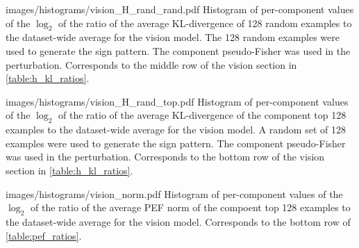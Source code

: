 \documentclass[dvipsnames]{article}
\begin{document}
\appendixhistogram
{images/histograms/vision_H_rand_rand.pdf}
{Histogram of per-component values of the $\log_2$ of the ratio of the average KL-divergence of 128 random examples to the dataset-wide average for the vision model.
The 128 random examples were used to generate the sign pattern.
The component pseudo-Fisher was used in the perturbation.
Corresponds to the middle row of the vision section in \cref{table:h_kl_ratios}.}

\appendixhistogram
{images/histograms/vision_H_rand_top.pdf}
{Histogram of per-component values of the $\log_2$ of the ratio of the average KL-divergence of the component top 128 examples to the dataset-wide average for the vision model.
A random set of 128 examples were used to generate the sign pattern.
The component pseudo-Fisher was used in the perturbation.
Corresponds to the bottom row of the vision section in \cref{table:h_kl_ratios}.}




\appendixhistogram
{images/histograms/vision_norm.pdf}
{Histogram of per-component values of the $\log_2$ of the ratio of the average PEF norm of the compoent top 128 examples to the dataset-wide average for the vision model.
Corresponds to the bottom row of \cref{table:pef_ratios}.}
\end{document}
